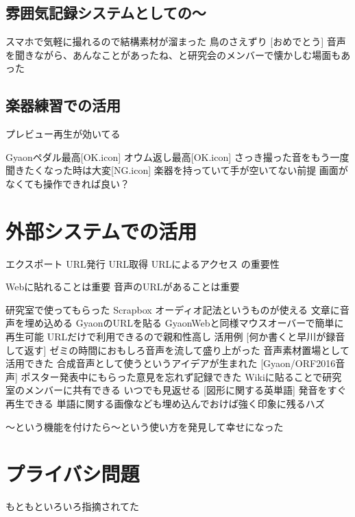 \subsection{雰囲気記録システムとしての〜}
   スマホで気軽に撮れるので結構素材が溜まった
   	鳥のさえずり
    [おめでとう]
    音声を聞きながら、あんなことがあったね、と研究会のメンバーで懐かしむ場面もあった

\subsection{楽器練習での活用}
プレビュー再生が効いてる

  	Gyaonペダル最高[OK.icon]
  	オウム返し最高[OK.icon]
   さっき撮った音をもう一度聞きたくなった時は大変[NG.icon]
   	楽器を持っていて手が空いてない前提
    画面がなくても操作できれば良い？


\section{外部システムでの活用}
エクスポート
URL発行
URL取得
URLによるアクセス
の重要性

Webに貼れることは重要
音声のURLがあることは重要

    研究室で使ってもらった
    Scrapbox
    オーディオ記法というものが使える
   	文章に音声を埋め込める
    	GyaonのURLを貼る
    GyaonWebと同様マウスオーバーで簡単に再生可能
    URLだけで利用できるので親和性高し
    活用例
     [何か書くと早川が録音して返す]
     	ゼミの時間におもしろ音声を流して盛り上がった
      音声素材置場として活用できた
      合成音声として使うというアイデアが生まれた
     [Gyaon/ORF2016音声]
     	ポスター発表中にもらった意見を忘れず記録できた
      Wikiに貼ることで研究室のメンバーに共有できる
      いつでも見返せる
     [図形に関する英単語]
     	発音をすぐ再生できる
      単語に関する画像なども埋め込んでおけば強く印象に残るハズ

 〜という機能を付けたら〜という使い方を発見して幸せになった

 \section{プライバシ問題}
 もともといろいろ指摘されてた\cite{}
